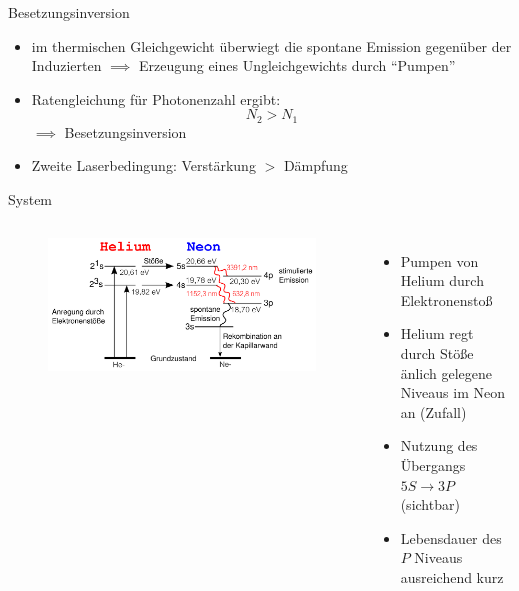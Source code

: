 \documentclass[10pt, aspectratio=169]{beamer}
\newcommand{\hne}{\ce{HeNe}}
\begin{document}
\begin{frame}{Besetzungsinversion}
  \begin{itemize}
  \item<1-> im thermischen Gleichgewicht \"uberwiegt die spontane
    Emission gegen\"uber der Induzierten \(\implies\) Erzeugung eines
    Ungleichgewichts durch ``Pumpen'' 
  \item<2-> Ratengleichung f\"ur Photonenzahl ergibt:
    \begin{equation}
      \label{eq:firstlaser}\tag{Erste Laserbedingung}
      N_2>N_1
    \end{equation}
    \(\implies\) Besetzungsinversion
  \item<3-> Zweite Laserbedingung: Verst\"arkung \(>\) D\"ampfung

  \end{itemize}
\end{frame}

\begin{frame}{\hne{} System}
  \begin{columns}
    \begin{figure}[H]
      \includegraphics[width=1\columnwidth]{heneniv.png}
    \end{figure}
    \begin{itemize}
    \item<1-> Pumpen von Helium durch Elektronensto\ss{}
    \item<2-> Helium regt durch St\"o\ss{}e \"anlich gelegene Niveaus
      im Neon an (Zufall)
    \item<3-> Nutzung des \"Ubergangs \(5S\rightarrow 3P\) (sichtbar)
    \item<4-> Lebensdauer des \(P\) Niveaus ausreichend kurz
    \end{itemize}
  \end{columns}
\end{frame}
\end{document}
